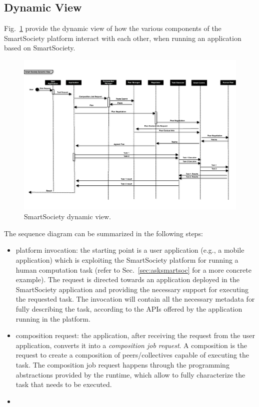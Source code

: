 \subsection{Dynamic View}
Fig.~\ref{fig:dynamic_view} provide the dynamic view of how the various components of the SmartSociety platform interact with each other, when running an application based on SmartSociety. 

\begin{figure}[!hbt]
 \centering
 \includegraphics[width=1\textwidth]{figs/dynamic_view.pdf}
 \caption{SmartSociety dynamic view.}
 \label{fig:dynamic_view}
\end{figure}

The sequence diagram can be summarized in the following steps:
\begin{itemize}
\item platform invocation: the starting point is a user application (e.g., a mobile application) which is exploiting the SmartSociety platform for running a human computation task (refer to Sec.~\ref{sec:asksmartsoc} for a more concrete example). The request is directed towards an application deployed in the SmartSociety application and providing the necessary support for executing the requested task. The invocation will contain all the necessary metadata for fully describing the task, according to the APIs offered by the application running in the platform.
\item composition request: the application, after receiving the request from the user application, converts it into a \textit{composition job request}. A composition is the request to create a composition of peers/collectives capable of executing the task. The composition job request happens through the programming abstractions provided by the runtime, which allow to fully characterize the task that needs to be executed.
\item   
\end{itemize}


